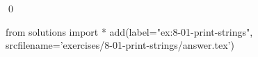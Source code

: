 
\begin{ex}
  \label{ex:8-01-print-strings}
  
  \qed
\end{ex}
\begin{python0}
from solutions import *
add(label="ex:8-01-print-strings",
    srcfilename='exercises/8-01-print-strings/answer.tex')
\end{python0}
